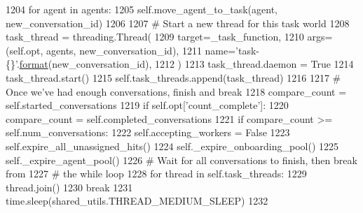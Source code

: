 \begin{DoxyCode}
1204                     \textcolor{keywordflow}{for} agent \textcolor{keywordflow}{in} agents:
1205                         self.move\_agent\_to\_task(agent, new\_conversation\_id)
1206 
1207                     \textcolor{comment}{# Start a new thread for this task world}
1208                     task\_thread = threading.Thread(
1209                         target=\_task\_function,
1210                         args=(self.opt, agents, new\_conversation\_id),
1211                         name=\textcolor{stringliteral}{'task-\{\}'}.\hyperlink{namespaceparlai_1_1chat__service_1_1services_1_1messenger_1_1shared__utils_a32e2e2022b824fbaf80c747160b52a76}{format}(new\_conversation\_id),
1212                     )
1213                     task\_thread.daemon = \textcolor{keyword}{True}
1214                     task\_thread.start()
1215                     self.task\_threads.append(task\_thread)
1216 
1217             \textcolor{comment}{# Once we've had enough conversations, finish and break}
1218             compare\_count = self.started\_conversations
1219             \textcolor{keywordflow}{if} self.opt[\textcolor{stringliteral}{'count\_complete'}]:
1220                 compare\_count = self.completed\_conversations
1221             \textcolor{keywordflow}{if} compare\_count >= self.num\_conversations:
1222                 self.accepting\_workers = \textcolor{keyword}{False}
1223                 self.expire\_all\_unassigned\_hits()
1224                 self.\_expire\_onboarding\_pool()
1225                 self.\_expire\_agent\_pool()
1226                 \textcolor{comment}{# Wait for all conversations to finish, then break from}
1227                 \textcolor{comment}{# the while loop}
1228                 \textcolor{keywordflow}{for} thread \textcolor{keywordflow}{in} self.task\_threads:
1229                     thread.join()
1230                 \textcolor{keywordflow}{break}
1231             time.sleep(shared\_utils.THREAD\_MEDIUM\_SLEEP)
1232 
\end{DoxyCode}
\mbox{\label{classparlai_1_1mturk_1_1core_1_1dev_1_1mturk__manager_1_1MTurkManager_a539bd100a420b5750644480f9ad3fb12}} 
